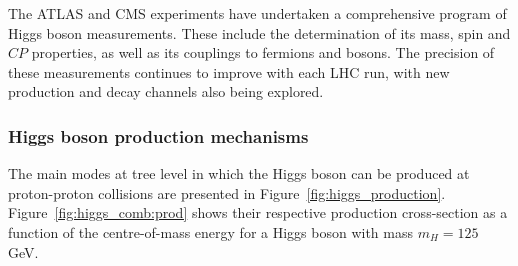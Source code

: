 The ATLAS and CMS experiments have undertaken a comprehensive program of Higgs boson measurements. These include the determination of its mass, spin and $CP$ properties, as well as its couplings to fermions and bosons. The precision of these measurements continues to improve with each LHC run, with new production and decay channels also being explored.

\subsubsection*{Higgs boson production mechanisms}
\label{sec:higgs_production}
The main modes at tree level in which the Higgs boson can be produced at proton-proton collisions are presented in Figure~\ref{fig:higgs_production}. Figure~\ref{fig:higgs_comb:prod} shows their respective production cross-section as a function of the centre-of-mass energy for a Higgs boson with mass $m_{H}=125$ GeV.

